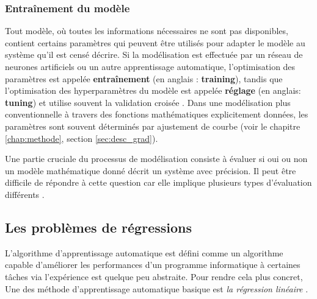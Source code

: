 	\subsubsection{\textbf{Entraînement du modèle}}
	
	Tout modèle, où toutes les informations nécessaires ne sont pas disponibles, contient certains paramètres qui peuvent être utilisés pour adapter le modèle au système qu'il est censé décrire. Si la modélisation est effectuée par un réseau de neurones artificiels ou un autre apprentissage automatique, l'optimisation des paramètres est appelée \textbf{entraînement} (en anglais : \textbf{training}), tandis que l'optimisation des hyperparamètres du modèle est appelée \textbf{réglage} (en anglais: \textbf{tuning}) et utilise souvent la validation croisée \cite{goodfellow2016deep}. Dans une modélisation plus conventionnelle à travers des fonctions mathématiques explicitement données, les paramètres sont souvent déterminés par ajustement de courbe (voir le chapitre \ref{chap:methode}, section \ref{sec:desc_grad}).
	
	Une partie cruciale du processus de modélisation consiste à évaluer si oui ou non un modèle mathématique donné décrit un système avec précision. Il peut être difficile de répondre à cette question car elle implique plusieurs types d'évaluation différents \cite{matloff2017statistical, goodfellow2016deep}.
	
	\subsection{Les problèmes de régressions} \label{sec:regression_problem}
	
	L'algorithme d'apprentissage automatique est défini comme un algorithme capable d'améliorer les performances d'un programme informatique à certaines tâches via l'expérience est quelque peu abstraite. Pour rendre cela plus concret, Une des méthode d'apprentissage automatique basique est \emph{la régression linéaire} \cite{goodfellow2016deep,sarkar2017practical}.
	
	
